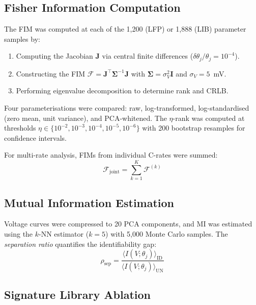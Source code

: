 \documentclass[preprint,12pt]{elsarticle}
\begin{document}
\subsection{Fisher Information Computation}
\label{sec:fisher_compute}

The FIM was computed at each of the 1{,}200 (LFP) or 1{,}888 (LIB) parameter samples by:
\begin{enumerate}
\item Computing the Jacobian $\bm{J}$ via central finite differences ($\delta\theta_j / \theta_j = 10^{-4}$).
\item Constructing the FIM $\mathcal{F} = \bm{J}^\top \bm{\Sigma}^{-1} \bm{J}$ with $\bm{\Sigma} = \sigma_V^2 \bm{I}$ and $\sigma_V = 5$~mV.
\item Performing eigenvalue decomposition to determine rank and CRLB.
\end{enumerate}

Four parameterisations were compared: raw, log-transformed, log-standardised (zero mean, unit variance), and PCA-whitened.
The $\eta$-rank was computed at thresholds $\eta \in \{10^{-2}, 10^{-3}, 10^{-4}, 10^{-5}, 10^{-6}\}$ with 200 bootstrap resamples for confidence intervals.

For multi-rate analysis, FIMs from individual C-rates were summed:
\begin{equation}
\mathcal{F}_{\mathrm{joint}} = \sum_{k=1}^{K} \mathcal{F}^{(k)}
\label{eq:multirate}
\end{equation}

\subsection{Mutual Information Estimation}
\label{sec:mi_compute}

Voltage curves were compressed to 20 PCA components, and MI was estimated using the $k$-NN estimator ($k = 5$) with 5{,}000 Monte Carlo samples.
The \emph{separation ratio} quantifies the identifiability gap:
\begin{equation}
\rho_{\mathrm{sep}} = \frac{\langle I(V; \theta_j) \rangle_{\mathrm{ID}}}{\langle I(V; \theta_j) \rangle_{\mathrm{UN}}}
\label{eq:sep_ratio}
\end{equation}

\subsection{Signature Library Ablation}
\label{sec:ablation}
\end{document}
